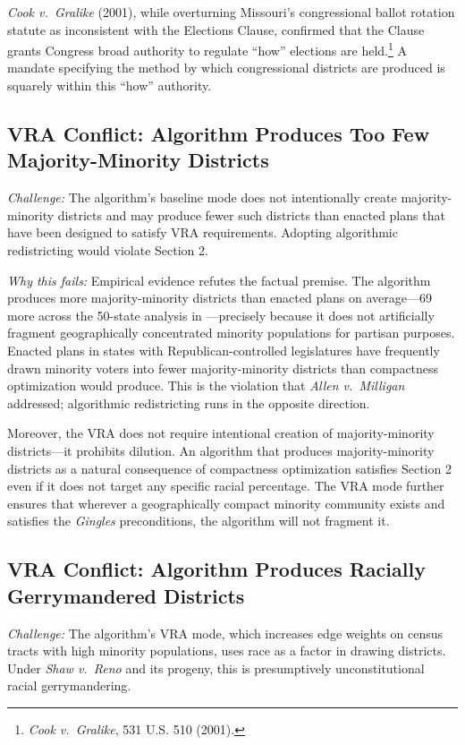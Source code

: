 \textit{Cook v.\ Gralike} (2001), while overturning Missouri's congressional ballot rotation statute as inconsistent with the Elections Clause, confirmed that the Clause grants Congress broad authority to regulate ``how'' elections are held.\footnote{\textit{Cook v.\ Gralike}, 531 U.S. 510 (2001).} A mandate specifying the method by which congressional districts are produced is squarely within this ``how'' authority.

\subsection{VRA Conflict: Algorithm Produces Too Few Majority-Minority Districts}

\textit{Challenge:} The algorithm's baseline mode does not intentionally create majority-minority districts and may produce fewer such districts than enacted plans that have been designed to satisfy VRA requirements. Adopting algorithmic redistricting would violate Section 2.

\textit{Why this fails:} Empirical evidence refutes the factual premise. The algorithm produces more majority-minority districts than enacted plans on average---69 more across the 50-state analysis in \citet{dellaLibera2026vra}---precisely because it does not artificially fragment geographically concentrated minority populations for partisan purposes. Enacted plans in states with Republican-controlled legislatures have frequently drawn minority voters into fewer majority-minority districts than compactness optimization would produce. This is the violation that \textit{Allen v.\ Milligan} addressed; algorithmic redistricting runs in the opposite direction.

Moreover, the VRA does not require intentional creation of majority-minority districts---it prohibits dilution. An algorithm that produces majority-minority districts as a natural consequence of compactness optimization satisfies Section 2 even if it does not target any specific racial percentage. The VRA mode further ensures that wherever a geographically compact minority community exists and satisfies the \textit{Gingles} preconditions, the algorithm will not fragment it.

\subsection{VRA Conflict: Algorithm Produces Racially Gerrymandered Districts}

\textit{Challenge:} The algorithm's VRA mode, which increases edge weights on census tracts with high minority populations, uses race as a factor in drawing districts. Under \textit{Shaw v.\ Reno} and its progeny, this is presumptively unconstitutional racial gerrymandering.

